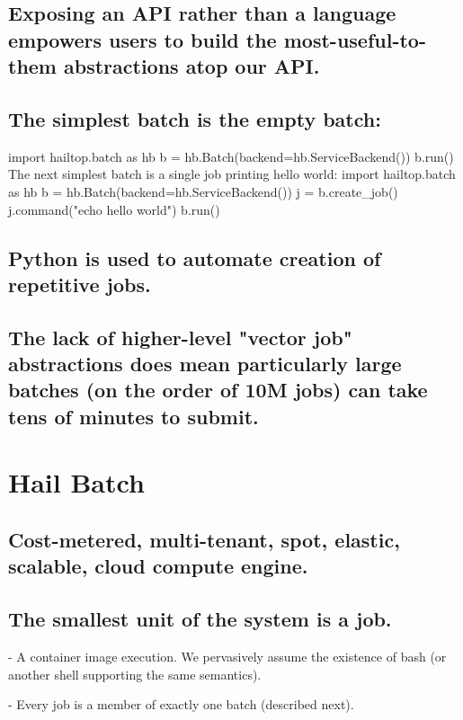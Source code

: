 \documentclass[10pt,a4paper%
]{article}
\begin{document}
\subsection{Exposing an API rather than a language empowers users to build the most-useful-to-them abstractions atop our API.}

\subsection{The simplest batch is the empty batch:}

    import hailtop.batch as hb
    b = hb.Batch(backend=hb.ServiceBackend())
    b.run()
    The next simplest batch is a single job printing hello world:
    import hailtop.batch as hb
    b = hb.Batch(backend=hb.ServiceBackend())
    j = b.create\_job()
    j.command("echo hello world")
    b.run()

\subsection{Python is used to automate creation of repetitive jobs.}

\subsection{The lack of higher-level "vector job" abstractions does mean particularly large batches (on the order of 10M jobs) can take tens of minutes to submit.}

\section{Hail Batch}

\subsection{Cost-metered, multi-tenant, spot, elastic, scalable, cloud compute engine.}

\subsection{The smallest unit of the system is a job.}

    - A container image execution. We pervasively assume the existence of bash (or another shell supporting the same semantics).

    - Every job is a member of exactly one batch (described next).
\end{document}
